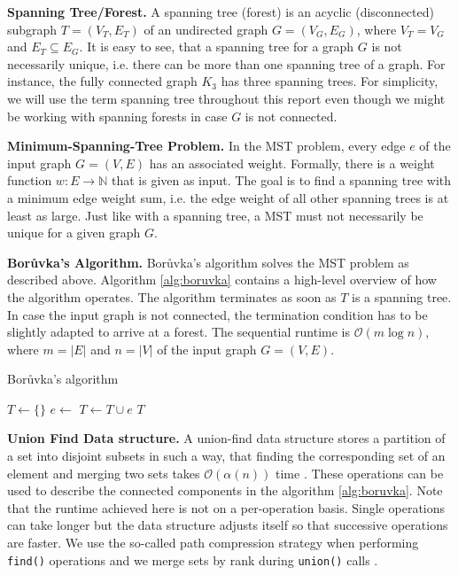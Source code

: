 \documentclass[letterpaper]{article}
\newcommand{\N}[0]{\mathbb{N}}
\newcommand{\bigoh}{\mathcal O}
\newcommand{\mypar}[1]{{\bf #1.}}
\begin{document}
\mypar{Spanning Tree/Forest}
A spanning tree (forest) is an acyclic (disconnected) subgraph $T = (V_T, E_T)$ of an undirected graph $G = (V_G, E_G)$,
where $V_T = V_G$ and $E_T \subseteq E_G$. It is easy to see, that a spanning tree for a graph $G$ is not necessarily
unique, i.e. there can be more than one spanning tree of a graph. For instance, the fully connected graph $K_3$ has
three spanning trees. For simplicity, we will use the term spanning tree throughout this report even though we might be
working with spanning forests in case $G$ is not connected.

\mypar{Minimum-Spanning-Tree Problem}
In the MST problem, every edge $e$ of the input graph $G = (V, E)$ has an associated weight. Formally, there is a weight
function $w : E \to \N$ that is given as input. The goal is to find a spanning tree with a minimum edge weight sum, i.e.
the edge weight of all other spanning trees is at least as large. Just like with a spanning tree, a MST must not
necessarily be unique for a given graph $G$.

\mypar{Bor\r{u}vka's Algorithm}
Bor\r{u}vka's algorithm \cite{boruuvka1926jistem, nevsetvril2001otakar} solves the MST problem as described above.
Algorithm \ref{alg:boruvka} contains a high-level overview of how the algorithm operates. The algorithm terminates as
soon as $T$ is a spanning tree. In case the input graph is not connected, the termination condition has to be slightly
adapted to arrive at a forest. The sequential runtime is $\bigoh(m \log n)$, where $m = |E|$ and $n = |V|$ of the input
graph $G = (V, E)$.

\begin{algorithm}[!t]
  \caption{Bor\r{u}vka's algorithm}
  \label{alg:boruvka}
  \begin{algorithmic}
    \State $T \gets \{ \}$
        \State $e \gets$ 
        \State $T \gets T \cup e$
      \EndFor
      \State {}
    \EndWhile
    \State \Return $T$
  \end{algorithmic}
\end{algorithm}

\mypar{Union Find Data structure}
A union-find data structure stores a partition of a set into disjoint subsets in such a way, that finding the
corresponding set of an element and merging two sets takes $\bigoh(\alpha(n))$ time \cite{efficiency_union_find}. These
operations can be used to describe the connected components in the algorithm \ref{alg:boruvka}. Note that the runtime
achieved here is not on a per-operation basis. Single operations can take longer but the data structure adjusts itself
so that successive operations are faster.
We use the so-called path compression strategy when performing \verb|find()| operations and we merge sets by rank during
\verb|union()| calls \cite{intro_to_algos}.
\end{document}
